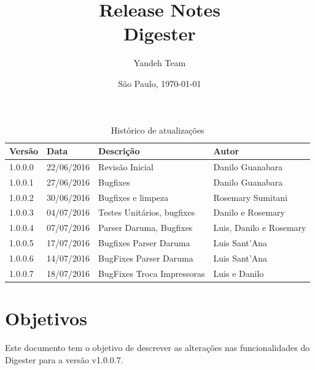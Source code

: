\documentclass{article}      %
\title{Release Notes \\
      Digester \versiondigester}  %
\author{Yandeh Team}              %
\date{São Paulo, \today}
\newcommand{\versiondigester}{v1.0.0.7}
\begin{document}

\maketitle                   %

\thispagestyle{firststyle}


\begin{table}[!ht]
\centering
\caption{Histórico de atualizações}
\label{my-label}
\begin{tabular}{|l|l|l|l|}
\hline
\textbf{Versão} & \textbf{Data} & \textbf{Descrição}                & \textbf{Autor}                                       \\ \hline
1.0.0.0           & 22/06/2016    & Revisão Inicial                 & Danilo Guanabara                                     \\ \hline
1.0.0.1           & 27/06/2016    & Bugfixes                        & Danilo Guanabara                                     \\ \hline
1.0.0.2           & 30/06/2016    & Bugfixes e limpeza              & Rosemary Sumitani                                    \\ \hline
1.0.0.3           & 04/07/2016    & Testes Unitários, bugfixes      & Danilo e Rosemary                                    \\ \hline
1.0.0.4           & 07/07/2016    & Parser Daruma, Bugfixes         & Luis, Danilo e Rosemary                              \\ \hline
1.0.0.5           & 17/07/2016    & Bugfixes Parser Daruma          & Luis Sant'Ana                                        \\ \hline
1.0.0.6           & 14/07/2016    & BugFixes Parser Daruma          & Luis Sant'Ana                                        \\ \hline  
1.0.0.7           & 18/07/2016    & BugFixes Troca Impressoras      & Luis e Danilo                                        \\ \hline  
\end{tabular}
\end{table}



\section{Objetivos}

Este documento tem o objetivo de descrever as alterações nas funcionalidades do Digester para a versão \versiondigester. 
\end{document}
